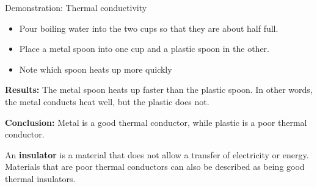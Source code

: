 \begin{g_experiment}{Demonstration: Thermal conductivity}
{\label{m38706*id66609}\begin{itemize}[noitemsep]
\label{m38706*uid102}\item Pour boiling water into the two cups so that they are about half full.
\label{m38706*uid103}\item Place a metal spoon into one cup and a plastic spoon in the other.
\label{m38706*uid104}\item Note which spoon heats up more quickly
\end{itemize}
        \par 
\label{m38706*eip-270}
	\par
      \label{m38706*id66666}\noindent{}\textbf{Results: }\newline
    The metal spoon heats up faster than the plastic spoon. In other words, the metal conducts heat well, but the plastic does not.\par 
\label{m38706*id66687}\noindent{}\textbf{Conclusion: }Metal is a good thermal conductor, while plastic is a poor thermal conductor.}
\end{g_experiment}
 \par 
      \label{m38706*id66699}An \textbf{insulator} is a material that does not allow a transfer of electricity or energy. Materials that are poor thermal conductors can also be described as being good thermal insulators.\par 
